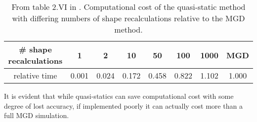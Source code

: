\documentclass[review]{elsarticle}
\begin{document}
\begin{table}[h]
    \caption{From table 2.VI in \cite{dulla_models_2005}. Computational cost
        of the quasi-static method with differing numbers of shape
        recalculations relative to the MGD method.}
    \label{tbl:dulla_costs}
    \begin{center}
        \begin{tabular}{|c|c|c|c|c|c|c|c|}
            \hline
            \# shape recalculations & 1 & 2 & 10 & 50 & 100 & 1000 & MGD \\
            \hline
            relative time & 0.001 & 0.024 & 0.172 & 0.458 & 0.822 & 1.102 &
                1.000 \\
            \hline
        \end{tabular}
    \end{center}
\end{table}

It is evident that while quasi-statics can save computational cost with some
degree of lost accuracy, if implemented poorly it can actually cost more than
a full MGD simulation.
\end{document}
